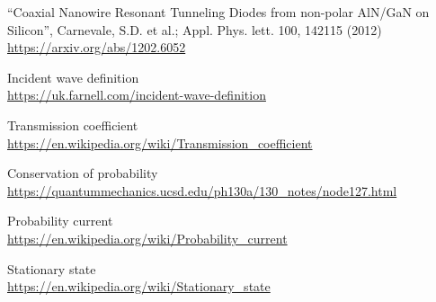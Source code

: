 \documentclass[12pt,a4paper,onecolumn]{article}
\theoremstyle{definition}
\theoremstyle{plain}
\begin{document}
\newpage





\begin{thebibliography}{99}
``Coaxial Nanowire Resonant Tunneling Diodes from non-polar AlN/GaN on Silicon'', Carnevale, S.D. et al.; Appl. Phys. lett. 100, 142115 (2012) \\
\href{https://arxiv.org/abs/1202.6052}{\footnotesize https://arxiv.org/abs/1202.6052}


Incident wave definition\\
\href{https://uk.farnell.com/incident-wave-definition}{\footnotesize https://uk.farnell.com/incident-wave-definition}

Transmission coefficient\\
\href{https://en.wikipedia.org/wiki/Transmission\_coefficient}{\footnotesize https://en.wikipedia.org/wiki/Transmission\_coefficient} 

Conservation of probability\\
\href{https://quantummechanics.ucsd.edu/ph130a/130\_notes/node127.html}{\footnotesize https://quantummechanics.ucsd.edu/ph130a/130\_notes/node127.html}

Probability current \\
\href{https://en.wikipedia.org/wiki/Probability\_current}{\footnotesize https://en.wikipedia.org/wiki/Probability\_current}

Stationary state \\
\href{https://en.wikipedia.org/wiki/Stationary\_state}{ \footnotesize https://en.wikipedia.org/wiki/Stationary\_state}
\end{thebibliography}
\end{document}
